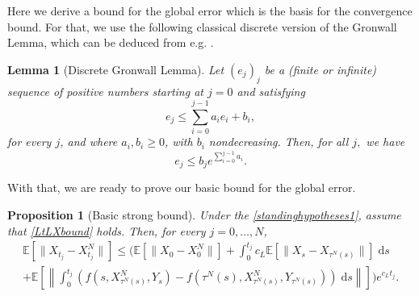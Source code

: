 \documentclass[reqno,12pt]{amsart}
\theoremstyle{plain} %
\newtheorem{lemma}{Lemma}[section]
\newtheorem{proposition}{Proposition}[section]
\theoremstyle{definition} %
\begin{document}
Here we derive a bound for the global error which is the basis for the convergence bound. For that, we use the following classical discrete version of the Gronwall Lemma, which can be deduced from e.g. \cite[Lemma 1]{Sugiyama1969}.

\begin{lemma}[Discrete Gronwall Lemma]
    \label{lemdiscretegronwall}
    Let $(e_j)_j$ be a (finite or infinite) sequence of positive numbers starting at $j=0$ and satisfying
    \begin{equation}
        \label{integralgronwall}
        e_j \leq \sum_{i=0}^{j-1} a_i e_i + b_i,
    \end{equation}
    for every $j$, and where $a_i, b_i \geq 0$, with $b_i$ nondecreasing. Then, for all $j,$ we have
    \begin{equation}
        \label{estimategronwall}
        e_j \leq b_j e^{\sum_{i=0}^{j-1} a_i}.
    \end{equation}
\end{lemma}

With that, we are ready to prove our basic bound for the global error.
\begin{proposition}[Basic strong bound]
    \label{propbasicstrongestimate}
    Under the \cref{standinghypotheses1}, assume that \cref{LtLXbound} holds. Then, for every $j = 0, \ldots, N$,
    \begin{multline}
        \label{expectedestimateglobalerrorintegral}
        \mathbb{E}\left[\|X_{t_j} - X_{t_j}^N\|\right] \leq \Bigg( \mathbb{E}\left[\|X_0 - X_0^N\|\right] + \int_0^{t_j} c_L \mathbb{E}\left[\|X_s - X_{\tau^N(s)}\|\right] \;\mathrm{d}s \\
        + \mathbb{E}\left[\left\|\int_0^{t_j} \left( f(s, X_{\tau^N(s)}^N, Y_s) - f(\tau^N(s), X_{\tau^N(s)}^N, Y_{\tau^N(s)}) \right)\;\mathrm{d}s\right\|\right]\Bigg) e^{c_L t_j}.
    \end{multline}
\end{proposition}
\end{document}

